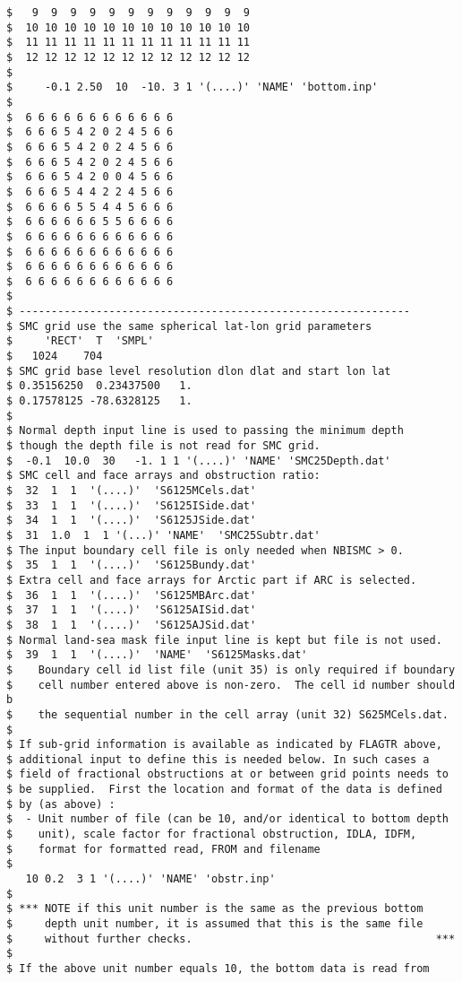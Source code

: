 \begin{footnotesize}
\begin{verbatim}
$   9  9  9  9  9  9  9  9  9  9  9  9
$  10 10 10 10 10 10 10 10 10 10 10 10
$  11 11 11 11 11 11 11 11 11 11 11 11
$  12 12 12 12 12 12 12 12 12 12 12 12
$
$     -0.1 2.50  10  -10. 3 1 '(....)' 'NAME' 'bottom.inp'
$
$  6 6 6 6 6 6 6 6 6 6 6 6
$  6 6 6 5 4 2 0 2 4 5 6 6
$  6 6 6 5 4 2 0 2 4 5 6 6
$  6 6 6 5 4 2 0 2 4 5 6 6
$  6 6 6 5 4 2 0 0 4 5 6 6
$  6 6 6 5 4 4 2 2 4 5 6 6
$  6 6 6 6 5 5 4 4 5 6 6 6
$  6 6 6 6 6 6 5 5 6 6 6 6
$  6 6 6 6 6 6 6 6 6 6 6 6
$  6 6 6 6 6 6 6 6 6 6 6 6
$  6 6 6 6 6 6 6 6 6 6 6 6
$  6 6 6 6 6 6 6 6 6 6 6 6
$
$ -------------------------------------------------------------
$ SMC grid use the same spherical lat-lon grid parameters 
$     'RECT'  T  'SMPL'
$   1024    704
$ SMC grid base level resolution dlon dlat and start lon lat 
$ 0.35156250  0.23437500   1.
$ 0.17578125 -78.6328125   1.
$
$ Normal depth input line is used to passing the minimum depth
$ though the depth file is not read for SMC grid. 
$  -0.1  10.0  30   -1. 1 1 '(....)' 'NAME' 'SMC25Depth.dat'
$ SMC cell and face arrays and obstruction ratio:
$  32  1  1  '(....)'  'S6125MCels.dat'
$  33  1  1  '(....)'  'S6125ISide.dat'
$  34  1  1  '(....)'  'S6125JSide.dat'
$  31  1.0  1  1 '(...)' 'NAME'  'SMC25Subtr.dat'
$ The input boundary cell file is only needed when NBISMC > 0.
$  35  1  1  '(....)'  'S6125Bundy.dat'
$ Extra cell and face arrays for Arctic part if ARC is selected. 
$  36  1  1  '(....)'  'S6125MBArc.dat'
$  37  1  1  '(....)'  'S6125AISid.dat'
$  38  1  1  '(....)'  'S6125AJSid.dat'
$ Normal land-sea mask file input line is kept but file is not used.
$  39  1  1  '(....)'  'NAME'  'S6125Masks.dat'
$    Boundary cell id list file (unit 35) is only required if boundary 
$    cell number entered above is non-zero.  The cell id number should b
$    the sequential number in the cell array (unit 32) S625MCels.dat.
$
$ If sub-grid information is available as indicated by FLAGTR above,
$ additional input to define this is needed below. In such cases a
$ field of fractional obstructions at or between grid points needs to
$ be supplied.  First the location and format of the data is defined
$ by (as above) :
$  - Unit number of file (can be 10, and/or identical to bottom depth
$    unit), scale factor for fractional obstruction, IDLA, IDFM,
$    format for formatted read, FROM and filename
$
   10 0.2  3 1 '(....)' 'NAME' 'obstr.inp'
$
$ *** NOTE if this unit number is the same as the previous bottom
$     depth unit number, it is assumed that this is the same file
$     without further checks.                                      ***
$
$ If the above unit number equals 10, the bottom data is read from

\end{verbatim}
\end{footnotesize}
